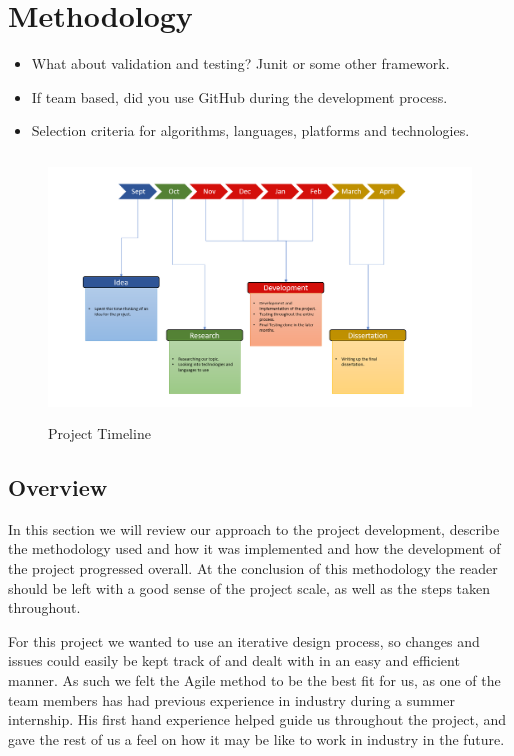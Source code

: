 
\chapter{Methodology}

\begin{itemize}
\item What about validation and testing? Junit or some other framework.
\item If team based, did you use GitHub during the development process.
\item Selection criteria for algorithms, languages, platforms and technologies.
\end{itemize}

\begin{figure}[H]
    \centering
    \includegraphics[width=140mm, height=70mm]{img/timeline.PNG}
    \caption{Project Timeline}
    \label{fig:timeline}
\end{figure}

\section{Overview}
In this section we will review our approach to the project development, describe the methodology used and how it was implemented and how the development of the project progressed overall. At the conclusion of this methodology the reader should be left with a good sense of the project scale, as well as the steps taken throughout.

For this project we wanted to use an iterative design process, so changes and issues could easily be kept track of and dealt with in an easy and efficient manner. As such we felt the Agile method to be the best fit for us, as one of the team members has had previous experience in industry during a summer internship. His first hand experience helped guide us throughout the project, and gave the rest of us a feel on how it may be like to work in industry in the future.


